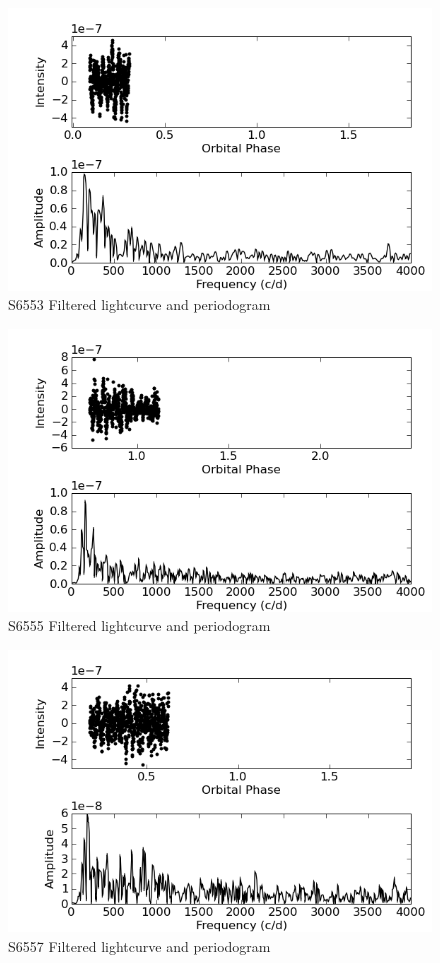 \begin{figure}
 \centering
 \includegraphics[bb=0 0 600 400,width=0.85\columnwidth]{images/archive_phot/S6553/S6553d_FF.png}
 \caption{S6553 Filtered lightcurve and periodogram}
 \label{S6553_c_FF}
\end{figure}

\begin{figure}
 \centering
 \includegraphics[bb=0 0 600 400,width=0.85\columnwidth]{images/archive_phot/S6555/S6555d_FF.png}
 \caption{S6555 Filtered lightcurve and periodogram}
 \label{S6555_c_FF}
\end{figure}

\begin{figure}
 \centering
 \includegraphics[bb=0 0 600 400,width=0.85\columnwidth]{images/archive_phot/S6557/S6557d_FF.png}
 \caption{S6557 Filtered lightcurve and periodogram}
 \label{S6557_c_FF}
\end{figure}


